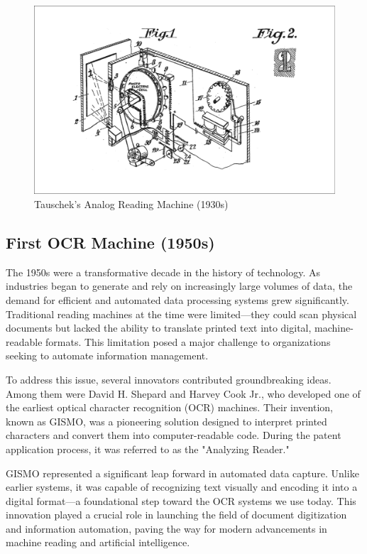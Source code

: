 \begin{figure}[ht]
    \centering
    \includegraphics[width=1\textwidth]{figures/Analog_Reading_Machine.png}
    \caption{Tauschek's Analog Reading Machine (1930s) \cite{diem2010recognizing}}
    \label{fig:analog-reading}
\end{figure}


\subsection{First OCR Machine (1950s)}
\label{sec:first-ocr}

The 1950s were a transformative decade in the history of technology. 
As industries began to generate and rely on increasingly large volumes of data, 
the demand for efficient and automated data processing systems grew significantly. 
Traditional reading machines at the time were limited—they could scan physical 
documents but lacked the ability to translate printed text into digital, machine-readable 
formats. This limitation posed a major challenge to organizations seeking to automate 
information management.

To address this issue, several innovators contributed groundbreaking ideas. Among them 
were David H. Shepard and Harvey Cook Jr., who developed one of the earliest optical character 
recognition (OCR) machines. Their invention, \cite{shepard1953gismo} known as GISMO, was a pioneering solution 
designed to interpret printed characters and convert them into computer-readable code. 
During the patent application process, it was referred to as the "Analyzing Reader."

GISMO represented a significant leap forward in automated data capture. Unlike earlier systems, 
it was capable of recognizing text visually and encoding it into a digital format—a 
foundational step toward the OCR systems we use today. This innovation played a crucial 
role in launching the field of document digitization and information automation, paving 
the way for modern advancements in machine reading and artificial intelligence.

